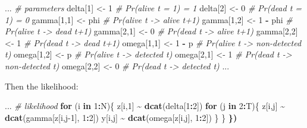 \documentclass[
  12pt,
]{krantz}
\newenvironment{Shaded}{\begin{snugshade}}{\end{snugshade}}
\newcommand{\CommentTok}[1]{\textcolor[rgb]{0.56,0.35,0.01}{\textit{#1}}}
\newcommand{\ControlFlowTok}[1]{\textcolor[rgb]{0.13,0.29,0.53}{\textbf{#1}}}
\newcommand{\DecValTok}[1]{\textcolor[rgb]{0.00,0.00,0.81}{#1}}
\newcommand{\ErrorTok}[1]{\textcolor[rgb]{0.64,0.00,0.00}{\textbf{#1}}}
\newcommand{\FunctionTok}[1]{\textcolor[rgb]{0.13,0.29,0.53}{\textbf{#1}}}
\newcommand{\NormalTok}[1]{#1}
\newcommand{\OtherTok}[1]{\textcolor[rgb]{0.56,0.35,0.01}{#1}}
\newcommand{\SpecialCharTok}[1]{\textcolor[rgb]{0.81,0.36,0.00}{\textbf{#1}}}
\begin{document}
\begin{Shaded}
\begin{Highlighting}[]
\NormalTok{...}
  \CommentTok{\# parameters}
\NormalTok{  delta[}\DecValTok{1}\NormalTok{] }\OtherTok{\textless{}{-}} \DecValTok{1}          \CommentTok{\# Pr(alive t = 1) = 1}
\NormalTok{  delta[}\DecValTok{2}\NormalTok{] }\OtherTok{\textless{}{-}} \DecValTok{0}          \CommentTok{\# Pr(dead t = 1) = 0}
\NormalTok{  gamma[}\DecValTok{1}\NormalTok{,}\DecValTok{1}\NormalTok{] }\OtherTok{\textless{}{-}}\NormalTok{ phi      }\CommentTok{\# Pr(alive t {-}\textgreater{} alive t+1)}
\NormalTok{  gamma[}\DecValTok{1}\NormalTok{,}\DecValTok{2}\NormalTok{] }\OtherTok{\textless{}{-}} \DecValTok{1} \SpecialCharTok{{-}}\NormalTok{ phi  }\CommentTok{\# Pr(alive t {-}\textgreater{} dead t+1)}
\NormalTok{  gamma[}\DecValTok{2}\NormalTok{,}\DecValTok{1}\NormalTok{] }\OtherTok{\textless{}{-}} \DecValTok{0}        \CommentTok{\# Pr(dead t {-}\textgreater{} alive t+1)}
\NormalTok{  gamma[}\DecValTok{2}\NormalTok{,}\DecValTok{2}\NormalTok{] }\OtherTok{\textless{}{-}} \DecValTok{1}        \CommentTok{\# Pr(dead t {-}\textgreater{} dead t+1)}
\NormalTok{  omega[}\DecValTok{1}\NormalTok{,}\DecValTok{1}\NormalTok{] }\OtherTok{\textless{}{-}} \DecValTok{1} \SpecialCharTok{{-}}\NormalTok{ p    }\CommentTok{\# Pr(alive t {-}\textgreater{} non{-}detected t)}
\NormalTok{  omega[}\DecValTok{1}\NormalTok{,}\DecValTok{2}\NormalTok{] }\OtherTok{\textless{}{-}}\NormalTok{ p        }\CommentTok{\# Pr(alive t {-}\textgreater{} detected t)}
\NormalTok{  omega[}\DecValTok{2}\NormalTok{,}\DecValTok{1}\NormalTok{] }\OtherTok{\textless{}{-}} \DecValTok{1}        \CommentTok{\# Pr(dead t {-}\textgreater{} non{-}detected t)}
\NormalTok{  omega[}\DecValTok{2}\NormalTok{,}\DecValTok{2}\NormalTok{] }\OtherTok{\textless{}{-}} \DecValTok{0}        \CommentTok{\# Pr(dead t {-}\textgreater{} detected t)}
\NormalTok{...}
\end{Highlighting}
\end{Shaded}

Then the likelihood:

\begin{Shaded}
\begin{Highlighting}[]
\NormalTok{...}
    \CommentTok{\# likelihood}
    \ControlFlowTok{for}\NormalTok{ (i }\ControlFlowTok{in} \DecValTok{1}\SpecialCharTok{:}\NormalTok{N)\{}
\NormalTok{    z[i,}\DecValTok{1}\NormalTok{] }\SpecialCharTok{\textasciitilde{}} \FunctionTok{dcat}\NormalTok{(delta[}\DecValTok{1}\SpecialCharTok{:}\DecValTok{2}\NormalTok{])}
    \ControlFlowTok{for}\NormalTok{ (j }\ControlFlowTok{in} \DecValTok{2}\SpecialCharTok{:}\NormalTok{T)\{}
\NormalTok{      z[i,j] }\SpecialCharTok{\textasciitilde{}} \FunctionTok{dcat}\NormalTok{(gamma[z[i,j}\DecValTok{{-}1}\NormalTok{], }\DecValTok{1}\SpecialCharTok{:}\DecValTok{2}\NormalTok{])}
\NormalTok{      y[i,j] }\SpecialCharTok{\textasciitilde{}} \FunctionTok{dcat}\NormalTok{(omega[z[i,j], }\DecValTok{1}\SpecialCharTok{:}\DecValTok{2}\NormalTok{])}
\NormalTok{    \}}
\NormalTok{  \}}
\ErrorTok{\})}
\end{Highlighting}
\end{Shaded}
\end{document}
